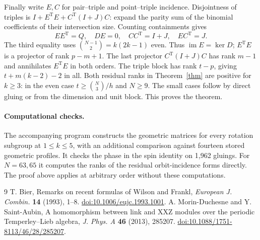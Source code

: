 \documentclass[11pt]{article}
\newcommand{\im}{\operatorname{im}}
\begin{document}
Finally write \(E,C\) for pair--triple and point--triple incidence.
Disjointness of triples is \(I+E^{\mathrm T}E+
C^{\mathrm T}(I+J)C\): expand the parity sum of the binomial coefficients
of their intersection size. Counting containments gives
\[
 EE^{\mathrm T}=Q,\quad DE=0,\quad CC^{\mathrm T}=I+J,\quad EC^{\mathrm T}=J .
\]
The third equality uses \(\binom{N-1}2=k(2k-1)\) even. Thus
\(\im E=\ker D\); \(E^{\mathrm T}E\) is a projector of rank \(p-m+1\).
The last projector \(C^{\mathrm T}(I+J)C\) has rank \(m-1\) and
annihilates \(E^{\mathrm T}E\) in both orders. The triple block
has rank \(t-p\), giving \(t+m(k-2)-2\) in all. Both residual ranks
in Theorem~\ref{thm} are positive for \(k\ge3\): in the even case
\(t\ge\binom N3/h\) and \(N\ge9\). The small cases follow by direct
gluing or from the dimension and unit block. This proves the theorem.

\paragraph{Computational checks.}
The accompanying program constructs the geometric matrices for every
rotation subgroup at \(1\le k\le5\), with an additional comparison
against fourteen stored geometric profiles. It checks the phase in
the spin identity on 1,962 gluings. For \(N=63,65\) it computes the
ranks of the residual orbit-incidence forms directly. The proof above
applies at arbitrary order without these computations.
\begin{thebibliography}{9}
 T. Bier, Remarks on recent formulas of Wilson and Frankl,
\emph{European J. Combin.} \textbf{14} (1993), 1--8.
\href{https://doi.org/10.1006/eujc.1993.1001}{doi:10.1006/eujc.1993.1001}.
 A. Morin-Duchesne and Y. Saint-Aubin,
A homomorphism between link and XXZ modules over the periodic Temperley--Lieb algebra,
\emph{J. Phys. A} \textbf{46} (2013), 285207.
\href{https://doi.org/10.1088/1751-8113/46/28/285207}{doi:10.1088/1751-8113/46/28/285207}.
\end{thebibliography}
\end{document}
